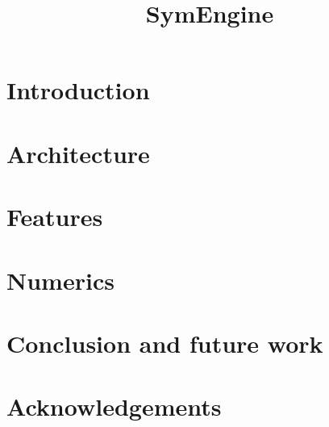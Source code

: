 \documentclass[fleqn,10pt,lineno,numbers]{wlpeerj} %
\title{SymEngine}
\begin{document}
\flushbottom
\maketitle
\thispagestyle{empty}

\section{Introduction}


\section{Architecture}
\label{sec:architecture}

\section{Features}
\label{sec:features}

\section{Numerics}
\label{sec:numerics}

\section{Conclusion and future work}
\label{sec:conclusion}


\section{Acknowledgements}
\label{sec:acknowledgements}



\end{document}
